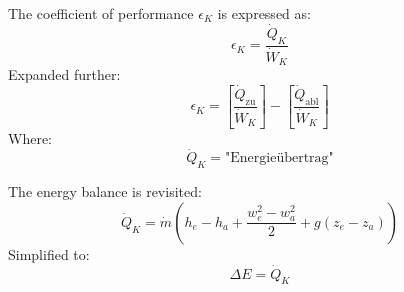 The coefficient of performance \( \epsilon_K \) is expressed as:  
\[
\epsilon_K = \frac{\dot{Q}_K}{\dot{W}_K}
\]  
Expanded further:  
\[
\epsilon_K = \left[ \frac{\dot{Q}_{\text{zu}}}{\dot{W}_K} \right] - \left[ \frac{\dot{Q}_{\text{abl}}}{\dot{W}_K} \right]
\]  
Where:  
\[
\dot{Q}_K = \text{"Energieübertrag"}
\]  

The energy balance is revisited:  
\[
\dot{Q}_K = \dot{m} \left( h_e - h_a + \frac{w_e^2 - w_a^2}{2} + g \left( z_e - z_a \right) \right)
\]  
Simplified to:  
\[
\Delta E = \dot{Q}_K
\]